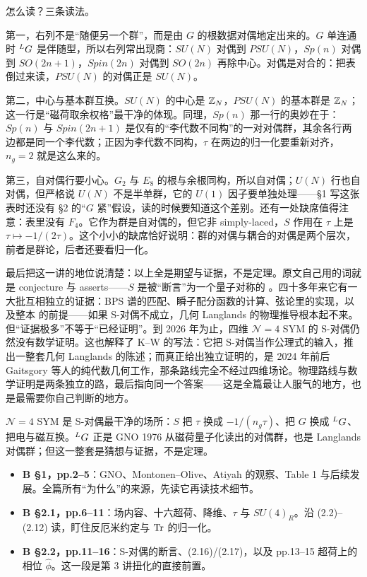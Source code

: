 怎么读？三条读法。

第一，右列不是“随便另一个群”，而是由 $G$ 的根数据对偶地定出来的。$G$ 单连通时 ${}^{L}G$ 是伴随型，所以右列常出现商：$SU(N)$ 对偶到 $PSU(N)$，$Sp(n)$ 对偶到 $SO(2n+1)$，$Spin(2n)$ 对偶到 $SO(2n)$ 再除中心。对偶是对合的：把表倒过来读，$PSU(N)$ 的对偶正是 $SU(N)$。

第二，中心与基本群互换。$SU(N)$ 的中心是 $\mathbb{Z}_N$，$PSU(N)$ 的基本群是 $\mathbb{Z}_N$；这一行是“磁荷取余权格”最干净的体现。同理，$Sp(n)$ 那一行的奥妙在于：$Sp(n)$ 与 $Spin(2n+1)$ 是仅有的“李代数不同构”的一对对偶群，其余各行两边都是同一个李代数；正因为李代数不同构，$\tau$ 在两边的归一化要重新对齐，$n_g=2$ 就是这么来的。

第三，自对偶行要小心。$G_2$ 与 $E_8$ 的根与余根同构，所以自对偶；$U(N)$ 行也自对偶，但严格说 $U(N)$ 不是半单群，它的 $U(1)$ 因子要单独处理——§1 写这张表时还没有 §2 的“$G$ 紧”假设，读的时候要知道这个差别。还有一处缺席值得注意：表里没有 $F_4$。它作为群是自对偶的，但它非 simply-laced，$S$ 作用在 $\tau$ 上是 $\tau\mapsto-1/(2\tau)$。这个小小的缺席恰好说明：群的对偶与耦合的对偶是两个层次，前者是群论，后者还要看归一化。

最后把这一讲的地位说清楚：以上全是期望与证据，不是定理。原文自己用的词就是 conjecture 与 asserts——$S$ 是被“断言”为一个量子对称的 。四十多年来它有一大批互相独立的证据：BPS 谱的匹配、瞬子配分函数的计算、弦论里的实现，以及整本 \cite{kw06} 的前提——如果 S-对偶不成立，几何 Langlands 的物理推导根本起不来。但“证据极多”不等于“已经证明”。到 2026 年为止，四维 $\mathcal N=4$ SYM 的 S-对偶仍然没有数学证明。这也解释了 K--W 的写法：它把 S-对偶当作公理式的输入，推出一整套几何 Langlands 的陈述；而真正给出独立证明的，是 2024 年前后 Gaitsgory 等人的纯代数几何工作，那条路线完全不经过四维场论。物理路线与数学证明是两条独立的路，最后指向同一个答案——这是全篇最让人服气的地方，也是最需要你自己判断的地方。

\begin{keybox}
$\mathcal N=4$ SYM 是 S-对偶最干净的场所：$S$ 把 $\tau$ 换成 $-1/(n_g\tau)$、把 $G$ 换成 ${}^{L}G$、把电与磁互换。${}^{L}G$ 正是 GNO 1976 从磁荷量子化读出的对偶群，也是 Langlands 对偶群；但这一整套是猜想与证据，不是定理。
\end{keybox}

\begin{follow}
\begin{itemize}
\item \textbf{B §1，pp.2--5}：GNO、Montonen--Olive、Atiyah 的观察、Table 1 与后续发展。全篇所有“为什么”的来源，先读它再读技术细节。
\item \textbf{B §2.1，pp.6--11}：场内容、十六超荷、降维、$\tau$ 与 $SU(4)_R$。沿 (2.2)--(2.12) 读，盯住反厄米约定与 $\operatorname{Tr}$ 的归一化。
\item \textbf{B §2.2，pp.11--16}：S-对偶的断言、(2.16)/(2.17)，以及 pp.13--15 超荷上的相位 $\hat\phi$。这一段是第 3 讲扭化的直接前置。
\end{itemize}
\end{follow}

